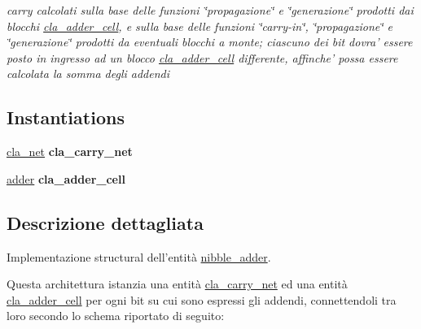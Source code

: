 \begin{DoxyCompactItemize}
\begin{DoxyCompactList}\small\item\em carry calcolati sulla base delle funzioni \char`\"{}propagazione\char`\"{} e \char`\"{}generazione\char`\"{} prodotti dai blocchi \hyperlink{classcla__adder__cell}{cla\+\_\+adder\+\_\+cell}, e sulla base delle funzioni \char`\"{}carry-\/in\char`\"{}, \char`\"{}propagazione\char`\"{} e \char`\"{}generazione\char`\"{} prodotti da eventuali blocchi a monte; ciascuno dei bit dovra' essere posto in ingresso ad un blocco \hyperlink{classcla__adder__cell}{cla\+\_\+adder\+\_\+cell} differente, affinche' possa essere calcolata la somma degli addendi \end{DoxyCompactList}\end{DoxyCompactItemize}
\subsection*{Instantiations}
 \begin{DoxyCompactItemize}
\item 
\hyperlink{classnibble__adder_1_1structural_abbf8fdf15c2d70392ab929c8ebe57439}{cla\+\_\+net}  {\bfseries cla\+\_\+carry\+\_\+net}   
\item 
\hyperlink{classnibble__adder_1_1structural_a9d7a8a381439c61aea549e7a47ec7a6f}{adder}  {\bfseries cla\+\_\+adder\+\_\+cell}   
\end{DoxyCompactItemize}


\subsection{Descrizione dettagliata}
Implementazione structural dell'entità \hyperlink{classnibble__adder}{nibble\+\_\+adder}. 

Questa architettura istanzia una entità \hyperlink{classcla__carry__net}{cla\+\_\+carry\+\_\+net} ed una entità \hyperlink{classcla__adder__cell}{cla\+\_\+adder\+\_\+cell} per ogni bit su cui sono espressi gli addendi, connettendoli tra loro secondo lo schema riportato di seguito\+:  

